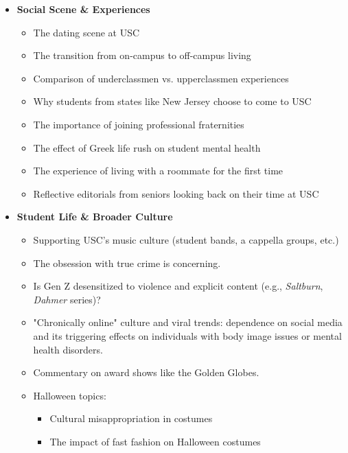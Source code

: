 \documentclass{article}
\begin{document}
\begin{itemize}
\item
  \textbf{Social Scene \& Experiences}

  \begin{itemize}
  \item
    The dating scene at USC
  \item
    The transition from on-campus to off-campus living
  \item
    Comparison of underclassmen vs. upperclassmen experiences
  \item
    Why students from states like New Jersey choose to come to USC
  \item
    The importance of joining professional fraternities
  \item
    The effect of Greek life rush on student mental health
  \item
    The experience of living with a roommate for the first time
  \item
    Reflective editorials from seniors looking back on their time at USC
  \end{itemize}
\item
  \textbf{Student Life \& Broader Culture}

  \begin{itemize}
  \item
    Supporting USC's music culture (student bands, a
    cappella groups, etc.)
  \item
    The obsession with true crime is concerning.
  \item
    Is Gen Z desensitized to violence and explicit content
    (e.g., \emph{Saltburn}, \emph{Dahmer} series)?
  \item
    "Chronically online" culture and viral trends: dependence on social
    media and its triggering effects on individuals with body image
    issues or mental health disorders.
  \item
    Commentary on award shows like the Golden Globes.
  \item
    Halloween topics:

    \begin{itemize}
    \item
      Cultural misappropriation in costumes
    \item
      The impact of fast fashion on Halloween costumes
    \end{itemize}
  \end{itemize}
\end{itemize}
\end{document}
